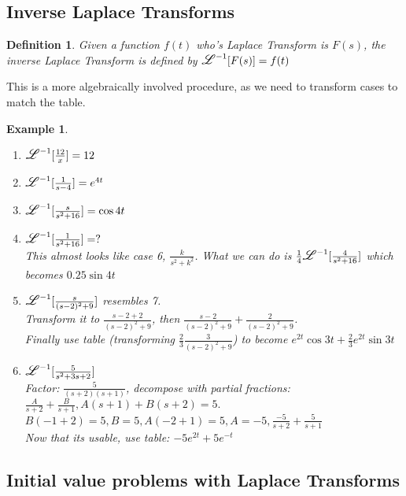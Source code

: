 \documentclass{article}
\newtheorem{definition}{Definition}
\newtheorem{example}{Example}
\newcommand\laplace{\mathlarger{\mathlarger{\mathscr{L}}}}
\begin{document}
\subsection{Inverse Laplace Transforms}

\begin{definition} 
	Given a function $f(t)$ who's Laplace Transform is $F(s)$, the inverse Laplace Transform is defined by $\laplace^{-1}[F(s)]=f(t)$
\end{definition}

This is a more algebraically involved procedure, as we need to transform cases to match the table.

\begin{example}

	\begin{enumerate}
		\item $\laplace^{-1}[\frac{12}{x}]=12$
		\item $\laplace^{-1}[\frac{1}{s-4}]=e^{4t}$
		\item $\laplace^{-1}[\frac{s}{s^2+16}]=\cos{4t}$
		\item $\laplace^{-1}[\frac{1}{s^2+16}]=?$\\
			This almost looks like case 6, $\frac{k}{s^2+k^2}$. What we can do is $\frac{1}{4}\laplace^{-1}[\frac{4}{s^2+16}]$ which becomes $0.25\sin{4t}$
		\item $\laplace^{-1}[\frac{s}{(s-2)^2+9}]$ resembles 7.
			\\Transform it to $\frac{s-2+2}{(s-2)^2+9}$, then $\frac{s-2}{(s-2)^2+9}+\frac{2}{(s-2)^2+9}$.\\
			Finally use table (transforming $\frac{2}{3}\frac{3}{(s-2)^2+9}$) to become $e^{2t}\cos{3t}+\frac{2}{3}e^{2t}\sin{3t}$
		\item $\laplace^{-1}[\frac{5}{s^2+3s+2}]$\\
			Factor: $\frac{5}{(s+2)(s+1)}$, decompose with partial fractions: $\frac{A}{s+2}+\frac{B}{s+1}, A(s+1)+B(s+2)=5.$\\
			$B(-1+2)=5, B=5, A(-2+1)=5, A=-5, \frac{-5}{s+2}+\frac{5}{s+1}$\\
			Now that its usable, use table: $-5e^{2t}+5e^{-t}$
	\end{enumerate}
\end{example}

\subsection{Initial value problems with Laplace Transforms}
\end{document}
